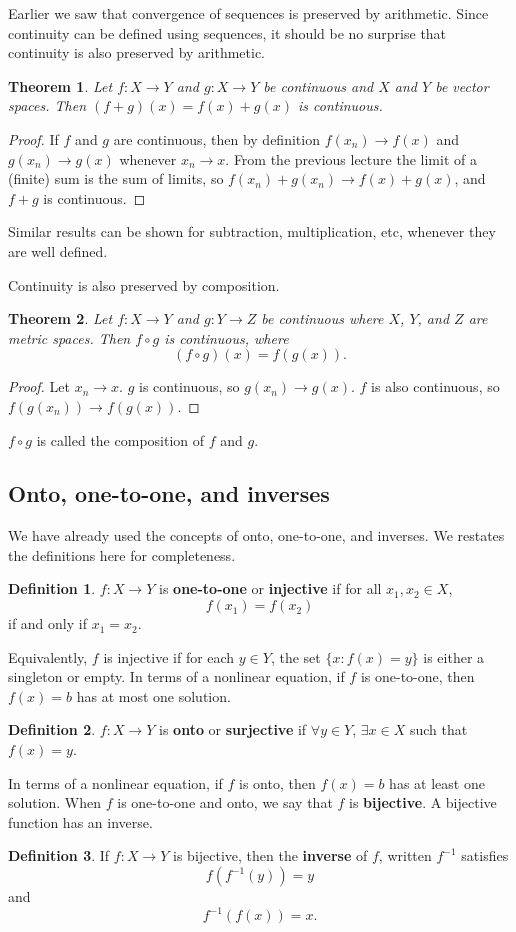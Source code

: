 \documentclass[12pt,reqno]{amsart}
\newtheorem{theorem}{Theorem}[section]
\theoremstyle{definition}
\newtheorem{definition}{Definition}[section]
\renewcommand{\to}{{\rightarrow}}
\begin{document}
Earlier we saw that convergence of sequences is preserved by
arithmetic. Since continuity can be defined using sequences, it should
be no surprise that continuity is also preserved by arithmetic.
\begin{theorem}
  Let $f:X \to Y$ and $g:X \to Y$ be continuous and $X$ and $Y$ be
  vector spaces. Then $(f+g)(x) = f(x) + g(x)$ is continuous.
\end{theorem}
\begin{proof}
  If $f$ and $g$ are continuous, then by definition $f(x_n) \to f(x)$
  and $g(x_n) \to g(x)$ whenever $x_n \to x$. From the previous
  lecture the limit of a (finite) sum is the sum of limits, so 
  $f(x_n) + g(x_n) \to f(x) + g(x)$, and $f+g$ is continuous.
\end{proof}
Similar results can be shown for subtraction, multiplication, etc,
whenever they are well defined. 

Continuity is also preserved by composition.
\begin{theorem}
  Let $f:X \to Y$ and $g:Y \to Z$ be continuous where $X$, $Y$, and
  $Z$ are metric spaces. Then $f \circ g$ is continuous, where
  \[ (f \circ g)(x) = f(g(x)). \]
\end{theorem}  
\begin{proof}
  Let $x_n \to x$. $g$ is continuous, so $g(x_n) \to g(x)$. $f$ is
  also continuous, so $f(g(x_n)) \to f(g(x))$.
\end{proof}
$f\circ g$ is called the composition of $f$ and $g$.

\subsection{Onto, one-to-one, and inverses}
We have already used the concepts of onto, one-to-one, and inverses.
We restates the definitions here for completeness.
\begin{definition}
  $f:X \to Y$ is \textbf{one-to-one} or \textbf{injective} if for all
  $x_1, x_2 \in X$, 
  \[ f(x_1) = f(x_2) \]
  if and only if $x_1 = x_2$.
\end{definition}
Equivalently, $f$ is injective if for each $y \in Y$, the set $\{x:
f(x) = y\}$ is either a singleton or empty.  In terms of a nonlinear
equation, if $f$ is one-to-one, then $f(x) = b$ has at most one
solution. 
\begin{definition}
  $f:X \to Y$ is \textbf{onto} or \textbf{surjective} if $\forall y
  \in Y$, $\exists x \in X$ such that $f(x) = y$.
\end{definition}
In terms of a nonlinear equation, if $f$ is onto, then $f(x) = b$ has
at least one solution. When $f$ is one-to-one and onto, we say that
$f$ is \textbf{bijective}. A bijective function has an inverse.
\begin{definition}
  If $f:X \to Y$ is bijective, then the \textbf{inverse} of $f$,
  written $f^{-1}$ satisfies
  \[ f(f^{-1} (y)) = y  \]
  and 
  \[ f^{-1} ( f(x) ) = x. \]
\end{definition}
\end{document}
